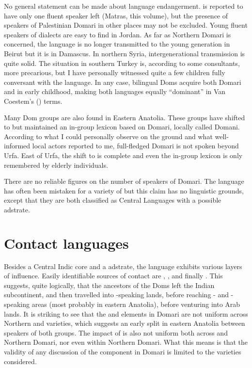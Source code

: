 \documentclass[output=paper]{langsci/langscibook}
\begin{document}
No general statement can be made about language {endangerment}.  is reported to have only one fluent speaker left (Matras, this volume), but the presence of speakers of Palestinian Domari in other places may not be excluded. Young fluent speakers of  dialects are easy to find in Jordan. As far as Northern Domari is concerned, the language is no longer transmitted to the young generation in Beirut but it is in Damascus. In northern Syria, intergenerational {transmission} is quite solid. The situation in southern Turkey is, according to some consultants, more precarious, but I have personally witnessed quite a few children fully conversant with the language. In any case, bilingual Doms acquire both Domari and  in early childhood, making both languages equally “dominant” in Van Coestem’s (\citeyear{VanCoetsem1988,VanCoetsem2000}) terms.

Many Dom groups are also found in Eastern {Anatolia}. These groups have shifted to  but maintained an in-group lexicon based on Domari, locally called Domani. According to what I could personally observe on the ground and what well-informed local actors reported to me, full-fledged Domari is not spoken beyond Urfa. East of Urfa, the shift to  is complete and even the in-group lexicon is only remembered by elderly individuals. 

There are no reliable figures on the number of speakers of Domari. The language has often been mistaken for a variety of  but this claim has no linguistic grounds, except that they are both classified as {Central}  Languages with a possible  {adstrate}.

\section{Contact languages}

Besides a {Central} Indic core and a  {adstrate}, the language exhibits various layers of influence. Easily identifiable sources of contact are , ,  and finally . This suggests, quite logically, that the ancestors of the Doms left the Indian subcontinent, and then travelled into -speaking lands, before reaching - and -speaking areas (most probably in eastern {Anatolia}), before venturing into Arab lands. It is striking to see that the  and  elements in Domari are not uniform across Northern and  varieties, which suggests an early split in eastern {Anatolia} between speakers of both groups. The impact of  is also not uniform both across  and Northern Domari, nor even within Northern Domari. What this means is that the validity of any discussion of the  component in Domari is limited to the varieties considered.
\end{document}
